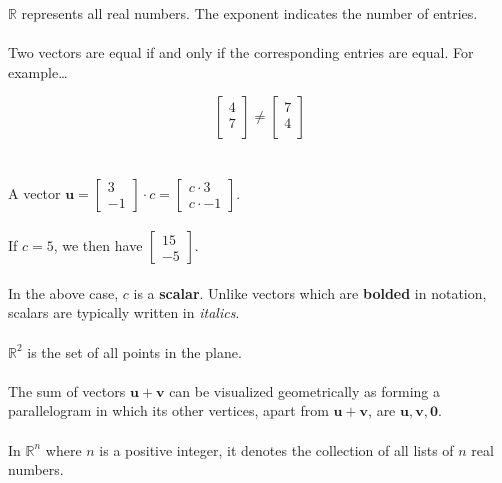\documentclass[12pt]{article}
\newcommand{\bm}[1]{\mathbf{{#1}}}
\begin{document}
$\mathbb{R}$ represents all real numbers. The exponent indicates the number of entries. \\ \\

Two vectors are equal if and only if the corresponding entries are equal. For example\dots

$$\begin{bmatrix} 4 \\ 7 \\ \end{bmatrix} \neq \begin{bmatrix} 7 \\ 4 \\ \end{bmatrix}$$ \\ \\

A vector $\bm{u} =\begin{bmatrix} 3 \\ - 1\end{bmatrix} \cdot c = \begin{bmatrix} c\cdot 3 \\ c\cdot -1 \end{bmatrix}$. \\ \\

If $c = 5$, we then have $\begin{bmatrix} 15 \\ -5 \end{bmatrix}$. \\ \\

In the above case, $c$ is a \textbf{scalar}. Unlike vectors which are \textbf{bolded} in notation, scalars are typically written in \emph{italics}. \\ \\

$\mathbb{R}^2$ is the set of all points in the plane. \\ \\

The sum of vectors $\bm{u} + \bm{v}$ can be visualized geometrically as forming a parallelogram in which its other vertices, apart from $\bm{u+v}$, are $\bm{u, v, 0}$. \\ \\

In $\mathbb{R}^n$ where $n$ is a positive integer, it denotes the collection of all lists of $n$ real numbers. \\ \\
\end{document}
